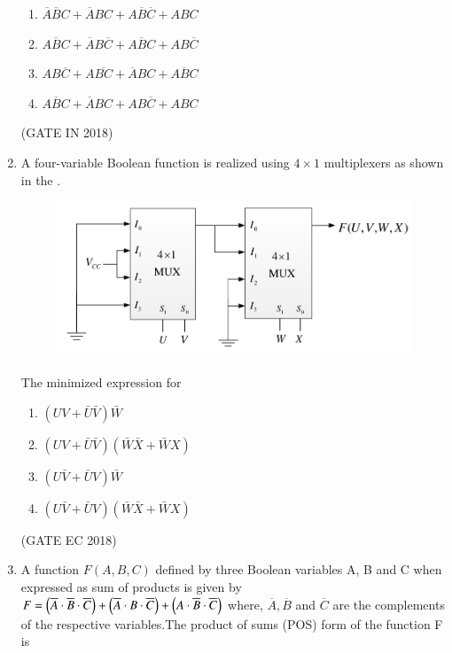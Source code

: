 \begin{enumerate}[label=\arabic*.,ref=\theenumi]
\begin{enumerate}
            \item$\overline{A}\overline{B}C+\overline{A}BC+A\overline{B}\overline{C}+ABC$
            \item$\overline{ABC}+\overline{A}B\overline{C}+A\overline{B}C+AB\overline{C}$
            \item$A B\overline{C}+A\overline{B C}+\overline{A}B C+\overline{ABC}$
            \item$\overline{ABC}+\overline{A}BC+AB\overline{C}+ABC$
                  \end{enumerate}
		\hfill(GATE IN 2018)
\item
	\label{prob:gate EC 31}
	A four-variable Boolean function is realized using $4\times 1$ multiplexers as shown in the 
        .
    \begin{figure}[!ht]
        \centering
        \includegraphics[width=\columnwidth]{figs/2018-gate-ec-31.png}
        \caption{}
        \label{fig:mux}
    \end{figure}

   The minimized expression for 
    \begin{enumerate}
       \item $\left ( UV+\bar{U}\bar{V} \right )\bar{W}$
       \item $\left ( UV+\bar{U}\bar{V} \right )\left ( \bar{W}\bar{X}+\bar{W}X\right )$
       \item $\left ( U\bar{V}+\bar{U}V \right )\bar{W}$
       \item $\left ( U\bar{V}+\bar{U}V \right )\left ( \bar{W}\bar{X}+\bar{W}X\right )$

    \end{enumerate}
    \hfill(GATE EC 2018)

\item
	\label{prob:2023-gate-ec-9}
	A function $F(A, B, C)$ defined by three Boolean variables A, B and C when expressed as sum of products is given by \newline$ F = \left(\overline{A} \cdot \overline{B} \cdot \overline{C}\right) + \left(\overline{A} \cdot B \cdot \overline{C}\right) + \left(A \cdot \overline{B} \cdot \overline{C}\right) $
where, $\overline{A},\overline{B}$ and $\overline{C}$ are the complements of the respective variables.The product of sums (POS) form of the function F is


\end{enumerate}
